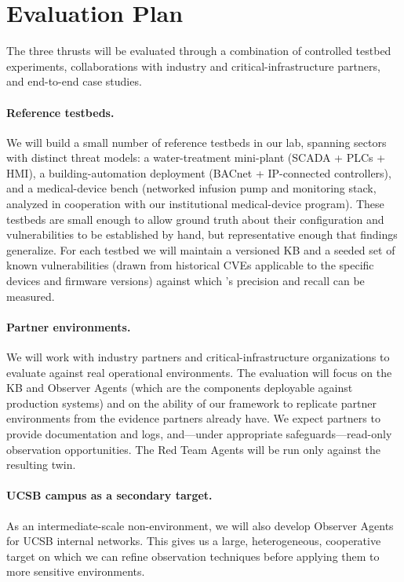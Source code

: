 \section{Evaluation Plan}
\label{sec:evaluation}

The three thrusts will be evaluated through a combination of
controlled testbed experiments, collaborations with industry and
critical-infrastructure partners, and end-to-end case studies.

\paragraph{Reference testbeds.}
We will build a small number of reference \cps testbeds in our lab,
spanning sectors with distinct threat models: a water-treatment
mini-plant (SCADA + PLCs + HMI), a building-automation deployment
(BACnet + IP-connected controllers), and a medical-device bench
(networked infusion pump and monitoring stack, analyzed in cooperation
with our institutional medical-device program). These testbeds are
small enough to allow ground truth about their configuration and
vulnerabilities to be established by hand, but representative enough
that findings generalize. For each testbed we will maintain a
versioned KB and a seeded set of known vulnerabilities (drawn from
historical CVEs applicable to the specific devices and firmware
versions) against which \sysname's precision and recall can be
measured.

\paragraph{Partner environments.}
We will work with industry partners and critical-infrastructure
organizations to evaluate \sysname against real operational environments.
The evaluation will focus on the KB and Observer Agents (which are
the components deployable against production systems) and on the
ability of our framework to replicate partner environments from the
evidence partners already have. We expect partners to provide
documentation and logs, and---under appropriate safeguards---read-only
observation opportunities. The Red Team Agents will be run only
against the resulting twin.

\paragraph{UCSB campus as a secondary target.}
As an intermediate-scale non-\cps environment, we will also develop
Observer Agents for UCSB internal networks. This gives us a large,
heterogeneous, cooperative target on which we can refine observation
techniques before applying them to more sensitive environments.

